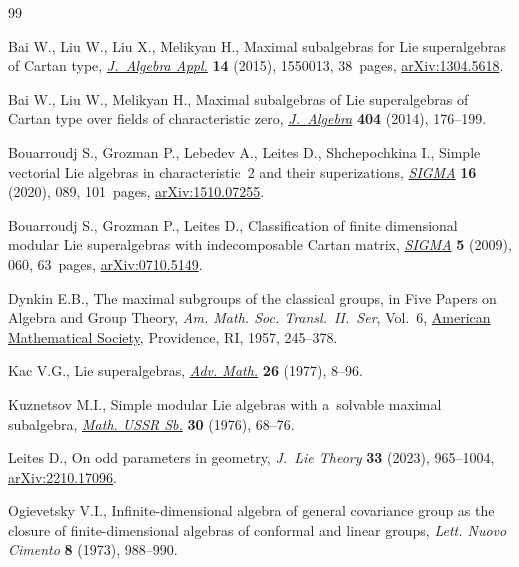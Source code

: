 \documentclass[10pt,a4paper]{amsart}
\newcommand {\<} [2] {{\left.\vphantom{#2}\right.^{#1\!}\!{#2}}}
\numberwithin{equation}{section}
\begin{document}
\begin{thebibliography}{99}
\footnotesize\itemsep=0pt

Bai W., Liu W., Liu X., Melikyan H., Maximal subalgebras for {L}ie
 superalgebras of {C}artan type,
 \href{https://doi.org/10.1142/S0219498815500139}{\textit{J.~Algebra Appl.}}
 \textbf{14} (2015), 1550013, 38~pages,
 \href{http://arxiv.org/abs/1304.5618}{arXiv:1304.5618}.

Bai W., Liu W., Melikyan H., Maximal subalgebras of {L}ie superalgebras of
 {C}artan type over fields of characteristic zero,
 \href{https://doi.org/10.1016/j.jalgebra.2013.12.033}{\textit{J.~Algebra}}
 \textbf{404} (2014), 176--199.

Bouarroudj S., Grozman P., Lebedev A., Leites D., Shchepochkina I., Simple
 vectorial {L}ie algebras in characteristic~2 and their superizations,
 \href{https://doi.org/10.3842/SIGMA.2020.089}{\textit{SIGMA}} \textbf{16}
 (2020), 089, 101~pages,
 \href{http://arxiv.org/abs/1510.07255}{arXiv:1510.07255}.

Bouarroudj S., Grozman P., Leites D., Classification of finite dimensional
 modular {L}ie superalgebras with indecomposable {C}artan matrix,
 \href{https://doi.org/10.3842/SIGMA.2009.060}{\textit{SIGMA}} \textbf{5}
 (2009), 060, 63~pages,
 \href{http://arxiv.org/abs/0710.5149}{arXiv:0710.5149}.

Dynkin E.B., The maximal subgroups of the classical groups, in Five Papers on
 Algebra and Group Theory, \textit{Am. Math. Soc. Transl.~II.~Ser}, Vol.~6,
 \href{https://doi.org/10.1090/trans2/006}{American Mathematical Society},
 Providence, RI, 1957, 245--378.

Kac V.G., Lie superalgebras,
 \href{https://doi.org/10.1016/0001-8708(77)90017-2}{\textit{Adv. Math.}}
 \textbf{26} (1977), 8--96.

Kuznetsov M.I., Simple modular {L}ie algebras with a~solvable maximal
 subalgebra,
 \href{https://doi.org/10.1070/SM1976v030n01ABEH001899}{\textit{Math. USSR
 Sb.}} \textbf{30} (1976), 68--76.

Leites D., On odd parameters in geometry, \textit{J.~Lie Theory} \textbf{33}
 (2023), 965--1004, \href{http://arxiv.org/abs/2210.17096}{arXiv:2210.17096}.

Ogievetsky V.I., Infinite-dimensional algebra of general covariance group as
 the closure of finite-dimensional algebras of conformal and linear groups,
 \textit{Lett. Nuovo Cimento} \textbf{8} (1973), 988--990.


\end{thebibliography}
\end{document}
